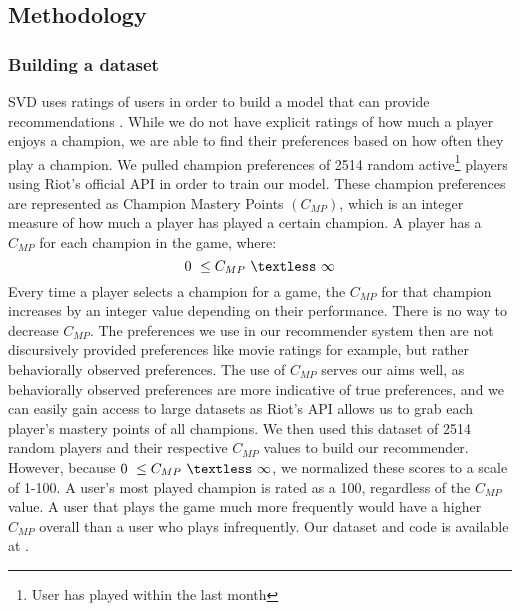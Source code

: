 \documentclass [11pt]{IEEEtran}
\begin{document}
\subsection{Methodology}
\subsubsection{Building a dataset}
SVD uses ratings of users in order to build a model that can provide recommendations \cite{koren2009matrix}. While we do not have explicit ratings of how much a player enjoys a champion, we are able to find their preferences based on how often they play a champion. We pulled champion preferences of 2514 random active\footnote{User has played within the last month} players using Riot’s official API \cite{riotapi} in order to train our model. These champion preferences are represented as Champion Mastery Points $(C_{MP})$, which is an integer measure of how much a player has played a certain champion. A player has a $C_{MP}$ for each champion in the game, where: 
$$
0 \ \leq C_{MP} \ \textless \ \infty
$$
Every time a player selects a champion for a game, the $C_{MP}$ for that champion increases by an integer value depending on their performance. There is no way to decrease $C_{MP}$. The preferences we use in our recommender system then are not discursively provided preferences like movie ratings for example, but rather behaviorally observed preferences. The use of $C_{MP}$ serves our aims well, as behaviorally observed preferences are more indicative of true preferences, and we can easily gain access to large datasets as Riot's API \cite{riotapi} allows us to grab each player's mastery points of all champions. We then used this dataset of 2514 random players and their respective $C_{MP}$ values to build our recommender. However, because $0 \ \leq C_{MP} \ \textless \ \infty$, we normalized these scores to a scale of 1-100. A user's most played champion is rated as a 100, regardless of the $C_{MP}$ value. A user that plays the game much more frequently would have a higher $C_{MP}$ overall than a user who plays infrequently. Our dataset and code is available at \cite{github}. 
\end{document}
